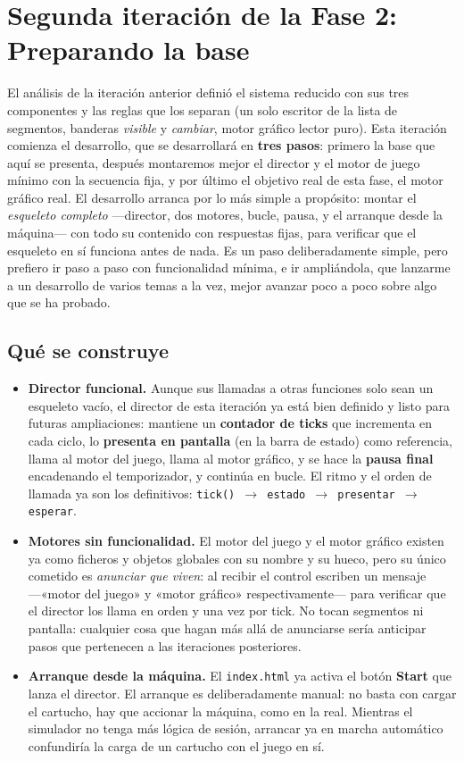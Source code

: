 \section{Segunda iteración de la Fase 2: Preparando la base}
\label{sec:PreparandoBase}

El análisis de la iteración anterior definió el sistema reducido con sus tres componentes y las reglas que los separan (un solo escritor de la lista de segmentos, banderas \emph{visible} y \emph{cambiar}, motor gráfico lector puro). Esta iteración comienza el desarrollo, que se desarrollará en \textbf{tres pasos}: primero la base que aquí se presenta, después montaremos mejor el director y el motor de juego mínimo con la secuencia fija, y por último el objetivo real de esta fase, el motor gráfico real. El desarrollo arranca por lo más simple a propósito: montar el \emph{esqueleto completo} ---director, dos motores, bucle, pausa, y el arranque desde la máquina--- con todo su contenido con respuestas fijas, para verificar que el esqueleto en sí funciona antes de nada. Es un paso deliberadamente simple, pero prefiero ir paso a paso con funcionalidad mínima, e ir ampliándola, que lanzarme a un desarrollo de varios temas a la vez, mejor avanzar poco a poco sobre algo que se ha probado.

\subsection{Qué se construye}
\label{subsec:QueSeConstruyeF2I2}

\begin{itemize}
	\item \textbf{Director funcional.} Aunque sus llamadas a otras funciones solo sean un esqueleto vacío, el director de esta iteración ya está bien definido y listo para futuras ampliaciones: mantiene un \textbf{contador de ticks} que incrementa en cada ciclo, lo \textbf{presenta en pantalla} (en la barra de estado) como referencia, llama al motor del juego, llama al motor gráfico, y se hace la \textbf{pausa final} encadenando el temporizador, y continúa en bucle. El ritmo y el orden de llamada ya son los definitivos: \texttt{tick() $\rightarrow$ estado $\rightarrow$ presentar $\rightarrow$ esperar}.
	\item \textbf{Motores sin funcionalidad.} El motor del juego y el motor gráfico existen ya como ficheros y objetos globales con su nombre y su hueco, pero su único cometido es \emph{anunciar que viven}: al recibir el control escriben un mensaje ---«motor del juego» y «motor gráfico» respectivamente--- para verificar que el director los llama en orden y una vez por tick. No tocan segmentos ni pantalla: cualquier cosa que hagan más allá de anunciarse sería anticipar pasos que pertenecen a las iteraciones posteriores.
	\item \textbf{Arranque desde la máquina.} El \texttt{index.html} ya activa el botón \textbf{Start} que lanza el director. El arranque es deliberadamente manual: no basta con cargar el cartucho, hay que accionar la máquina, como en la real. Mientras el simulador no tenga más lógica de sesión, arrancar ya en marcha automático confundiría la carga de un cartucho con el juego en sí.
\end{itemize}

